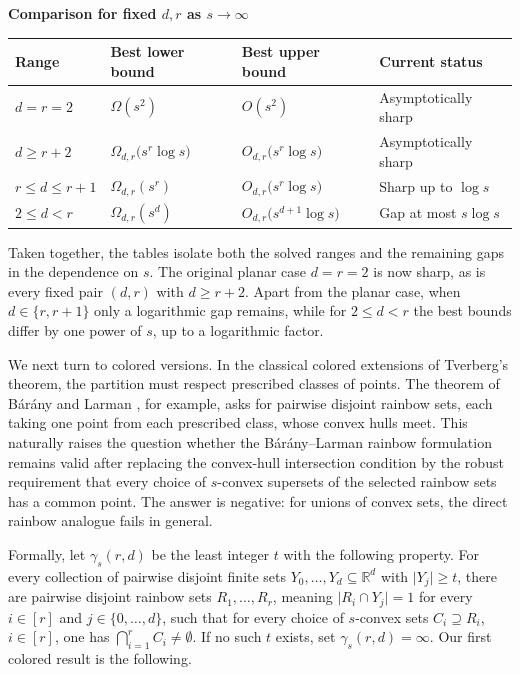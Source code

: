 \documentclass[11pt]{article}
\theoremstyle{definition}
\newcommand*{\abs}[1]{\lvert#1\rvert}
\newcommand{\R}{\mathbb{R}}
\begin{document}
\begin{center}
\small
\textbf{Comparison for fixed \(d,r\) as \(s\to\infty\)}\par\smallskip
\renewcommand{\arraystretch}{1.18}
\begin{tabular}{@{}p{}p{}p{}p{}@{}}
\toprule
Range & Best lower bound & Best upper bound & Current status \\
\midrule
\(d=r=2\) & \(\Omega(s^{2})\) & \(O(s^{2})\) & Asymptotically sharp \\
\(d\ge r+2\) & \(\Omega_{d,r}\bigl(s^{r}\log{s}\bigr)\) & \(O_{d,r}\bigl(s^{r}\log{s}\bigr)\) & Asymptotically sharp \\
\(r\le d\le r+1\) & \(\Omega_{d,r}(s^{r})\) & \(O_{d,r}\bigl(s^{r}\log{s}\bigr)\) & Sharp up to \(\log{s}\) \\
\(2\le d<r\) & \(\Omega_{d,r}(s^{d})\) & \(O_{d,r}\bigl(s^{d+1}\log{s}\bigr)\) & Gap at most \(s\log{s}\) \\
\bottomrule
\end{tabular}
\end{center}

Taken together, the tables isolate both the solved ranges and the remaining gaps in the dependence on \(s\). The original planar case \(d=r=2\) is now sharp, as is every fixed pair \((d,r)\) with \(d\ge r+2\). Apart from the planar case, when \(d\in\{r,r+1\}\) only a logarithmic gap remains, while for \(2\le d<r\) the best bounds differ by one power of \(s\), up to a logarithmic factor.

We next turn to colored versions. In the classical colored extensions of Tverberg's theorem, the partition must respect prescribed classes of points. The theorem of B\'ar\'any and Larman \cite{BaranyLarman1992}, for example, asks for pairwise disjoint rainbow sets, each taking one point from each prescribed class, whose convex hulls meet. This naturally raises the question whether the B\'ar\'any--Larman rainbow formulation remains valid after replacing the convex-hull intersection condition by the robust requirement that every choice of \(s\)-convex supersets of the selected rainbow sets has a common point. The answer is negative: for unions of convex sets, the direct rainbow analogue fails in general.

Formally, let \(\gamma_{s}(r,d)\) be the least integer \(t\) with the following property. For every collection of pairwise disjoint finite sets \(Y_{0},\ldots,Y_{d}\subseteq\R^{d}\) with \(\abs{Y_{j}}\ge t\), there are pairwise disjoint rainbow sets \(R_{1},\ldots,R_{r}\), meaning \(\abs{R_{i}\cap Y_{j}}=1\) for every \(i\in [r]\) and \(j\in\{0,\ldots,d\}\), such that for every choice of \(s\)-convex sets \(C_{i}\supseteq R_{i}\), \(i\in [r]\), one has \(\bigcap_{i=1}^{r}C_{i}\ne\emptyset\). If no such \(t\) exists, set \(\gamma_{s}(r,d)=\infty\). Our first colored result is the following.
\end{document}
